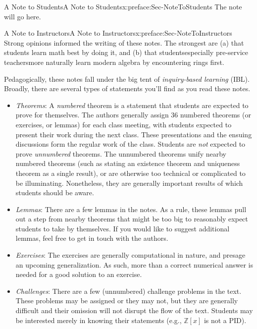 \documentclass[oneside,10pt,]{book}
\numberwithin{equation}{section}
\def\Z{{\mathbb Z}}
\begin{document}
%
\begin{preface}{A Note to Students}{}{A Note to Students}{}{}{x:preface:Sec-NoteToStudents}
The note will go here.%
\end{preface}
%
%
\typeout{************************************************}
\typeout{************************************************}
%
\begin{preface}{A Note to Instructors}{}{A Note to Instructors}{}{}{x:preface:Sec-NoteToInstructors}
Strong opinions informed the writing of these notes. The strongest are (a) that students learn math best by doing it, and (b) that students\textendash{}especially pre-service teachers\textendash{}more naturally learn modern algebra by encountering rings first.%
\par
Pedagogically, these notes fall under the big tent of \emph{inquiry-based learning} (IBL). Broadly, there are several types of statements you'll find as you read these notes.%
\begin{itemize}[label=\textbullet]
\item{}\emph{Theorems}: A \emph{numbered} theorem is a statement that students are expected to prove for themselves. The authors generally assign 3\textendash{}6 numbered theorems (or exercises, or lemmas) for each class meeting, with students expected to present their work during the next class. These presentations and the ensuing discussions form the regular work of the class. Students are \emph{not} expected to prove \emph{unnumbered} theorems. The unnumbered theorems unify nearby numbered theorems (such as stating an existence theorem and uniqueness theorem as a single result), or are otherwise too technical or complicated to be illuminating. Nonetheless, they are generally important results of which students should be aware.%
\item{}\emph{Lemmas}: There are a few lemmas in the notes. As a rule, these lemmas pull out a step from nearby theorems that might be too big to reasonably expect students to take by themselves. If you would like to suggest additional lemmas, feel free to get in touch with the authors.%
\item{}\emph{Exercises}: The exercises are generally computational in nature, and presage an upcoming generalization. As such, more than a correct numerical answer is needed for a good solution to an exercise.%
\item{}\emph{Challenges}: There are a few (unnumbered) challenge problems in the text. These problems may be assigned or they may not, but they are generally difficult and their omission will not disrupt the flow of the text. Students may be interested merely in knowing their statements (e.g., \(\Z[x]\) is not a PID).%

\end{itemize}
\end{preface}
\end{document}
